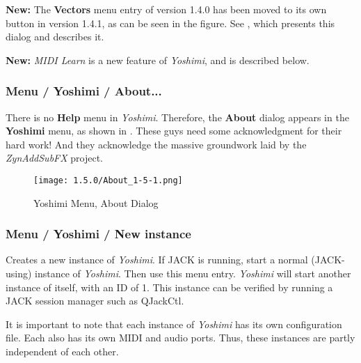    \textbf{New:}
   The \textbf{Vectors} menu entry of version 1.4.0 has been moved to its own
   button in version 1.4.1, as can be seen in the figure.  See
   , which presents this dialog and
   describes it.

   \textbf{New:}
   \textsl{MIDI Learn} is a new feature of \textsl{Yoshimi}, and is described
   below.

%

\subsubsection{Menu / Yoshimi / About...}
\label{subsubsec:menu_yoshimi_about}

   There is no \textbf{Help} menu in \textsl{Yoshimi}.  Therefore, the
   \textbf{About} dialog appears in the \textbf{Yoshimi} menu, as shown in
   .
   These guys need some acknowledgment for their hard work!
   And they acknowledge the massive groundwork laid by the
   \textsl{ZynAddSubFX} project.

\begin{figure}[H]
   \centering 
   \texttt{[image: 1.5.0/About\_1-5-1.png]}
   \caption{Yoshimi Menu, About Dialog}
   \label{fig:yoshimi_about_dialog}
\end{figure}

\subsubsection{Menu / Yoshimi / New instance}
\label{subsubsec:menu_yoshimi_new_instance}

   Creates a new instance of \textsl{Yoshimi}.
   If JACK is running,
   start a normal (JACK-using) instance of \textsl{Yoshimi}.
   Then use this menu entry.  \textsl{Yoshimi} will start another instance
   of itself, with an ID of 1.
   This instance can be verified by running a JACK session manager such as
   QJackCtl.

   It is important to note that each instance of \textsl{Yoshimi} has its
   own configuration file.  Each also has its own MIDI and audio ports.
   Thus, these instances are partly independent of each other.

